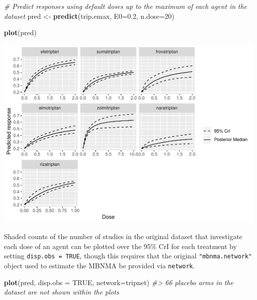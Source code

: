 \documentclass[]{article}
\newenvironment{Shaded}{\begin{snugshade}}{\end{snugshade}}
\newcommand{\CommentTok}[1]{\textcolor[rgb]{0.56,0.35,0.01}{\textit{#1}}}
\newcommand{\DataTypeTok}[1]{\textcolor[rgb]{0.13,0.29,0.53}{#1}}
\newcommand{\DecValTok}[1]{\textcolor[rgb]{0.00,0.00,0.81}{#1}}
\newcommand{\FloatTok}[1]{\textcolor[rgb]{0.00,0.00,0.81}{#1}}
\newcommand{\KeywordTok}[1]{\textcolor[rgb]{0.13,0.29,0.53}{\textbf{#1}}}
\newcommand{\NormalTok}[1]{#1}
\newcommand{\OtherTok}[1]{\textcolor[rgb]{0.56,0.35,0.01}{#1}}
\newcommand{\StringTok}[1]{\textcolor[rgb]{0.31,0.60,0.02}{#1}}
\begin{document}
\begin{Shaded}
\begin{Highlighting}[]
\CommentTok{# Predict responses using default doses up to the maximum of each agent in the dataset}
\NormalTok{pred <-}\StringTok{ }\KeywordTok{predict}\NormalTok{(trip.emax, }\DataTypeTok{E0=}\FloatTok{0.2}\NormalTok{, }\DataTypeTok{n.dose=}\DecValTok{20}\NormalTok{)}

\KeywordTok{plot}\NormalTok{(pred)}
\end{Highlighting}
\end{Shaded}

\includegraphics{mbnmadose_files/figure-latex/unnamed-chunk-43-1.pdf}

Shaded counts of the number of studies in the original dataset that
investigate each dose of an agent can be plotted over the 95\% CrI for
each treatment by setting \texttt{disp.obs\ =\ TRUE}, though this
requires that the original \texttt{"mbnma.network"} object used to
estimate the MBNMA be provided via \texttt{network}.

\begin{Shaded}
\begin{Highlighting}[]
\KeywordTok{plot}\NormalTok{(pred, }\DataTypeTok{disp.obs =} \OtherTok{TRUE}\NormalTok{, }\DataTypeTok{network=}\NormalTok{tripnet)}
\CommentTok{#> 66 placebo arms in the dataset are not shown within the plots}
\end{Highlighting}
\end{Shaded}
\end{document}
